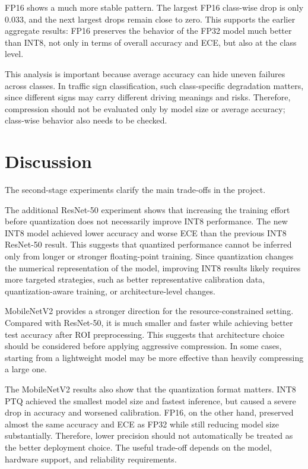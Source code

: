 \documentclass{article} %
\begin{document}
FP16 shows a much more stable pattern. The largest FP16 class-wise drop is only 0.033, and the next largest drops remain close to zero. This supports the earlier aggregate results: FP16 preserves the behavior of the FP32 model much better than INT8, not only in terms of overall accuracy and ECE, but also at the class level.

This analysis is important because average accuracy can hide uneven failures across classes. In traffic sign classification, such class-specific degradation matters, since different signs may carry different driving meanings and risks. Therefore, compression should not be evaluated only by model size or average accuracy; class-wise behavior also needs to be checked.

\section{Discussion}

The second-stage experiments clarify the main trade-offs in the project.

The additional ResNet-50 experiment shows that increasing the training effort before quantization does not necessarily improve INT8 performance. The new INT8 model achieved lower accuracy and worse ECE than the previous INT8 ResNet-50 result. This suggests that quantized performance cannot be inferred only from longer or stronger floating-point training. Since quantization changes the numerical representation of the model, improving INT8 results likely requires more targeted strategies, such as better representative calibration data, quantization-aware training, or architecture-level changes.

MobileNetV2 provides a stronger direction for the resource-constrained setting. Compared with ResNet-50, it is much smaller and faster while achieving better test accuracy after ROI preprocessing. This suggests that architecture choice should be considered before applying aggressive compression. In some cases, starting from a lightweight model may be more effective than heavily compressing a large one.

The MobileNetV2 results also show that the quantization format matters. INT8 PTQ achieved the smallest model size and fastest inference, but caused a severe drop in accuracy and worsened calibration. FP16, on the other hand, preserved almost the same accuracy and ECE as FP32 while still reducing model size substantially. Therefore, lower precision should not automatically be treated as the better deployment choice. The useful trade-off depends on the model, hardware support, and reliability requirements.
\end{document}
